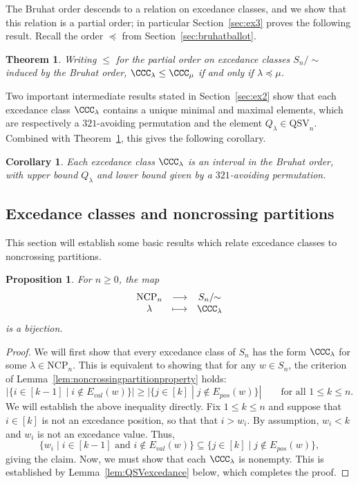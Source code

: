 \documentclass[12pt]{amsart}
\newtheorem{thm}[equation]{Theorem}
\newtheorem{prop}[equation]{Proposition}
\newtheorem{cor}[equation]{Corollary}
\theoremstyle{definition}
\theoremstyle{remark}
\numberwithin{equation}{section}
\newcommand{\QSV}{\mathrm{QSV}}
\newcommand{\NCP}{\mathrm{NCP}}
\newcommand{\EP}{E_{pos}}
\newcommand{\EV}{E_{val}}
\begin{document}
The Bruhat order descends to a relation on excedance classes, and we show that this relation is a partial order; in particular Section~\ref{sec:ex3} proves the following result.  Recall the order $\preceq$ from Section~\ref{sec:bruhatballot}.

\begin{thm}
\label{thm:excedancequotient}
Writing $\le$ for the partial order on excedance classes $S_{n}/\!\!\sim$ induced by the Bruhat order, $\CCC_{\lambda} \le \CCC_{\mu}$ if and only if $\lambda \preceq \mu$.
\end{thm}

Two important intermediate results stated in Section~\ref{sec:ex2} show that each excedance class $\CCC_{\lambda}$ contains a unique minimal and maximal elements, which are respectively a $321$-avoiding permutation and the element $Q_{\lambda} \in \QSV_{n}$.  Combined with Theorem~\ref{thm:excedancequotient}, this gives the following corollary.  

\begin{cor}\label{cor:interval}
Each excedance class $\CCC_{\lambda}$ is an interval in the Bruhat order, with upper bound $Q_{\lambda}$ and lower bound given by a $321$-avoiding permutation.
\end{cor}

\subsection{Excedance classes and noncrossing partitions}
\label{sec:ex1}

This section will establish some basic results which relate excedance classes to noncrossing partitions.  

\begin{prop}
For $n \ge 0$, the map
\[
\begin{array}{ccc}
\NCP_{n} & \longrightarrow & S_{n}/\!\!\sim \\
\lambda & \longmapsto & \CCC_{\lambda}
\end{array}
\]
is a bijection.
\end{prop}
\begin{proof}
We will first show that every excedance class of $S_{n}$ has the form $\CCC_{\lambda}$ for some $\lambda \in \NCP_{n}$.  
This is equivalent to showing that for any $w \in S_{n}$, the criterion of Lemma~\ref{lem:noncrossingpartitionproperty} holds:
\[
|\{i \in [k-1] \;|\; i \notin \EV(w)\}| \ge |\{ j \in [k] \;|\; j \notin \EP(w)\}| \qquad\text{for all $1 \le k \le n$}.
\]
We will establish the above inequality directly.  Fix $1 \le k \le n$ and suppose that $i \in [k]$ is not an excedance position, so that that $i > w_{i}$.  By assumption, $w_{i} < k$ and $w_{i}$ is not an excedance value.  Thus, 
\[
\{w_{i} \;|\; \text{$i \in [k-1]$ and $i \notin \EV(w)$} \} \subseteq \{j \in [k] \;|\; j \notin \EP(w)\},
\]
giving the claim.  Now, we must show that each $\CCC_{\lambda}$ is nonempty.  This is established by Lemma~\ref{lem:QSVexcedance} below, which completes the proof.
\end{proof}
\end{document}
